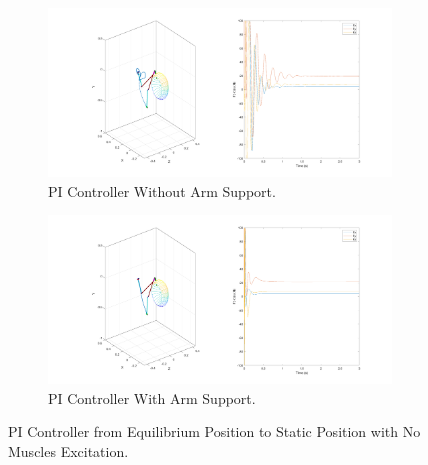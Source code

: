 \begin{figure}[h!] 
    \centering
    \begin{subfigure}[b]{0.8\linewidth}
       \includegraphics[width=\linewidth]{Pictures/Results/static_without_support.png}
        \caption{PI Controller Without Arm Support.}
    \end{subfigure}

    \vspace{1cm} %
    \begin{subfigure}[b]{0.8\linewidth}            
        \includegraphics[width=\linewidth]{Pictures/Results/static_with_support.png}
        \caption{PI Controller With Arm Support.}
    \end{subfigure}

    \caption{PI Controller from Equilibrium Position to Static Position with No Muscles Excitation.}
    \label{fig:PINoExcitation}

\end{figure}

